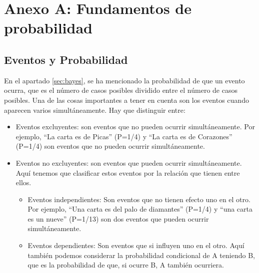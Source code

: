 \chapter{Anexo A: Fundamentos de probabilidad}
\label{ch:AxA}

\section{Eventos y Probabilidad}

En el apartado \ref{sec:bayes}, se ha mencionado la probabilidad de que un evento ocurra, que es el número de casos posibles dividido entre el número de casos posibles. Una de las cosas importantes a tener en cuenta son los eventos cuando aparecen varios simultáneamente.
Hay que distinguir entre:
\begin{itemize}
\item Eventos excluyentes: son eventos que no pueden ocurrir simultáneamente. Por ejemplo, “La carta es de Picas” (P=1/4) y “La carta es de Corazones” (P=1/4) son eventos que no pueden ocurrir simultáneamente.
\item Eventos no excluyentes: son eventos que pueden ocurrir simultáneamente. Aquí tenemos que clasificar estos eventos por la relación que tienen entre ellos.
\begin{itemize}
\item Eventos independientes: Son eventos que no tienen efecto uno en el otro. Por ejemplo, “Una carta es del palo de diamantes” (P=1/4) y “una carta es un nueve” (P=1/13) son dos eventos que pueden ocurrir simultáneamente. 
\item Eventos dependientes: Son eventos que si influyen uno en el otro. Aquí también podemos considerar la probabilidad condicional de A teniendo B, que es la probabilidad de que, si ocurre B, A también ocurriera. 
\end{itemize} 
\end{itemize} 


